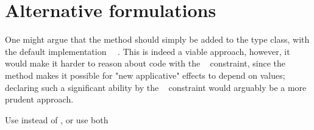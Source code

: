 \section{Alternative formulations}\label{sec-alternatives}

One might argue that the  method should simply be added to the
 type class, with the default implementation
~\hs{=}~. This is indeed a viable approach, however, it
would make it harder to reason about code with the ~
constraint, since the  method makes it possible for "new applicative"
effects to depend on values; declaring such a significant ability by the
~ constraint would arguably be a more prudent approach.

Use  instead of , or use both
